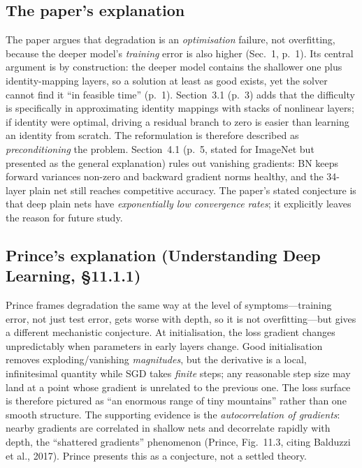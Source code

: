 \documentclass[11pt,a4paper]{article}
\begin{document}
\subsection{The paper's explanation}

The paper argues that degradation is an \emph{optimisation} failure, not overfitting, because the deeper model's \emph{training} error is also higher (Sec.~1, p.~1). Its central argument is by construction: the deeper model contains the shallower one plus identity-mapping layers, so a solution at least as good exists, yet the solver cannot find it ``in feasible time'' (p.~1). Section~3.1 (p.~3) adds that the difficulty is specifically in approximating identity mappings with stacks of nonlinear layers; if identity were optimal, driving a residual branch to zero is easier than learning an identity from scratch. The reformulation is therefore described as \emph{preconditioning} the problem. Section~4.1 (p.~5, stated for ImageNet but presented as the general explanation) rules out vanishing gradients: BN keeps forward variances non-zero and backward gradient norms healthy, and the 34-layer plain net still reaches competitive accuracy. The paper's stated conjecture is that deep plain nets have \emph{exponentially low convergence rates}; it explicitly leaves the reason for future study.

\subsection{Prince's explanation (Understanding Deep Learning, \S11.1.1)}

Prince frames degradation the same way at the level of symptoms---training error, not just test error, gets worse with depth, so it is not overfitting---but gives a different mechanistic conjecture. At initialisation, the loss gradient changes unpredictably when parameters in early layers change. Good initialisation removes exploding/vanishing \emph{magnitudes}, but the derivative is a local, infinitesimal quantity while SGD takes \emph{finite} steps; any reasonable step size may land at a point whose gradient is unrelated to the previous one. The loss surface is therefore pictured as ``an enormous range of tiny mountains'' rather than one smooth structure. The supporting evidence is the \emph{autocorrelation of gradients}: nearby gradients are correlated in shallow nets and decorrelate rapidly with depth, the ``shattered gradients'' phenomenon (Prince, Fig.~11.3, citing Balduzzi et al., 2017). Prince presents this as a conjecture, not a settled theory.
\end{document}
